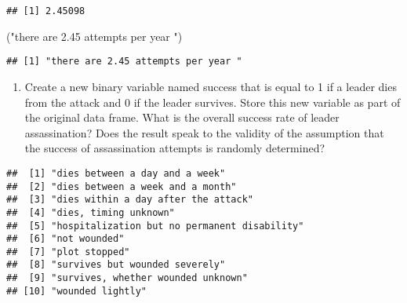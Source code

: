 \documentclass[
]{article}
\newenvironment{Shaded}{\begin{snugshade}}{\end{snugshade}}
\newcommand{\KeywordTok}[1]{\textcolor[rgb]{0.13,0.29,0.53}{\textbf{#1}}}
\newcommand{\NormalTok}[1]{#1}
\newcommand{\OperatorTok}[1]{\textcolor[rgb]{0.81,0.36,0.00}{\textbf{#1}}}
\newcommand{\StringTok}[1]{\textcolor[rgb]{0.31,0.60,0.02}{#1}}
\providecommand{\tightlist}{%
  \setlength{\itemsep}{0pt}\setlength{\parskip}{0pt}}
\begin{document}
\begin{Shaded}
\end{Shaded}

\begin{verbatim}
## [1] 2.45098
\end{verbatim}

\begin{Shaded}
\begin{Highlighting}[]
\NormalTok{(}\StringTok{"there are 2.45 attempts per year "}\NormalTok{)}
\end{Highlighting}
\end{Shaded}

\begin{verbatim}
## [1] "there are 2.45 attempts per year "
\end{verbatim}

\begin{enumerate}
\def\labelenumi{\arabic{enumi}.}
\setcounter{enumi}{1}
\tightlist
\item
  Create a new binary variable named success that is equal to 1 if a
  leader dies from the attack and 0 if the leader survives. Store this
  new variable as part of the original data frame. What is the overall
  success rate of leader assassination? Does the result speak to the
  validity of the assumption that the success of assassination attempts
  is randomly determined?
\end{enumerate}

\begin{Shaded}
\end{Shaded}

\begin{verbatim}
##  [1] "dies between a day and a week"              
##  [2] "dies between a week and a month"            
##  [3] "dies within a day after the attack"         
##  [4] "dies, timing unknown"                       
##  [5] "hospitalization but no permanent disability"
##  [6] "not wounded"                                
##  [7] "plot stopped"                               
##  [8] "survives but wounded severely"              
##  [9] "survives, whether wounded unknown"          
## [10] "wounded lightly"
\end{verbatim}
\end{document}
